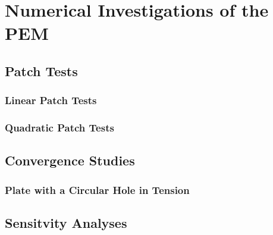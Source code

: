 \chapter{Numerical Investigations of the PEM}


	\section{Patch Tests}

		\subsection{Linear Patch Tests}

		\subsection{Quadratic Patch Tests}

	\section{Convergence Studies}

		\subsection{Plate with a Circular Hole in Tension}

	\section{Sensitvity Analyses}

